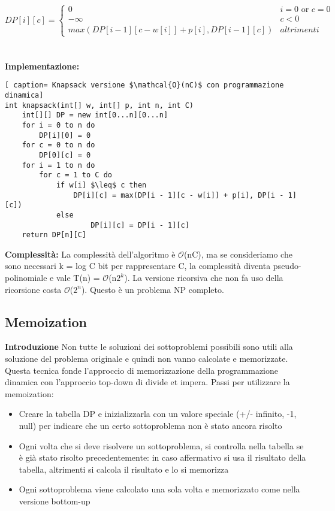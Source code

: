 \documentclass[../cheatSheetAlgoritmi.tex]{subfiles}
\begin{document}
\begin{equation*}
  	DP[i][c] =\begin{cases}
    	0 & \text{$i = 0$  or  $c = 0$}\\
    	-\infty & \text{$c < 0$}\\
    	max(DP[i -1][c-w[i]]+p[i], DP[i-1][c]) & \text{$altrimenti$}
  	\end{cases}
\end{equation*} \\\\
\newpage
\noindent
\textbf{Implementazione:}
\begin{lstlisting}[ caption= Knapsack versione $\mathcal{O}(nC)$ con programmazione dinamica]
int knapsack(int[] w, int[] p, int n, int C)
	int[][] DP = new int[0...n][0...n]
	for i = 0 to n do
		DP[i][0] = 0
	for c = 0 to n do
		DP[0][c] = 0
	for i = 1 to n do
		for c = 1 to C do
			if w[i] $\leq$ c then
				DP[i][c] = max(DP[i - 1][c - w[i]] + p[i], DP[i - 1][c])
			else
					DP[i][c] = DP[i - 1][c]
	return DP[n][C]
\end{lstlisting}
\textbf{Complessità:} La complessità dell'algoritmo è $\mathcal{O}$(nC), ma se consideriamo che sono necessari k = log C bit per rappresentare C, la complessità diventa pseudo-polinomiale e vale T(n) = $\mathcal{O}$(n$2^{k}$).
La versione ricorsiva che non fa uso della ricorsione costa $\mathcal{O}$($2^{n}$). Questo è un problema NP completo. 
\\

\subsection{Memoization}
\textbf{Introduzione} Non tutte le soluzioni dei sottoproblemi possibili sono utili alla soluzione del problema originale e quindi non vanno calcolate e memorizzate. Questa tecnica fonde l'approccio di memorizzazione della programmazione dinamica con l'approccio top-down di divide et impera. Passi per utilizzare la memoization:
\begin{itemize}
	\item Creare la tabella DP e inizializzarla con un valore speciale (+/- infinito, -1, null) per indicare che un certo sottoproblema non è stato ancora risolto 
	\item Ogni volta che si deve risolvere un sottoproblema, si controlla nella tabella se è già stato risolto precedentemente: in caso affermativo si usa il risultato della tabella, altrimenti si calcola il risultato e lo si memorizza
	\item Ogni sottoproblema viene calcolato una sola volta e memorizzato come nella versione bottom-up
\end{itemize}
\newpage
\end{document}
